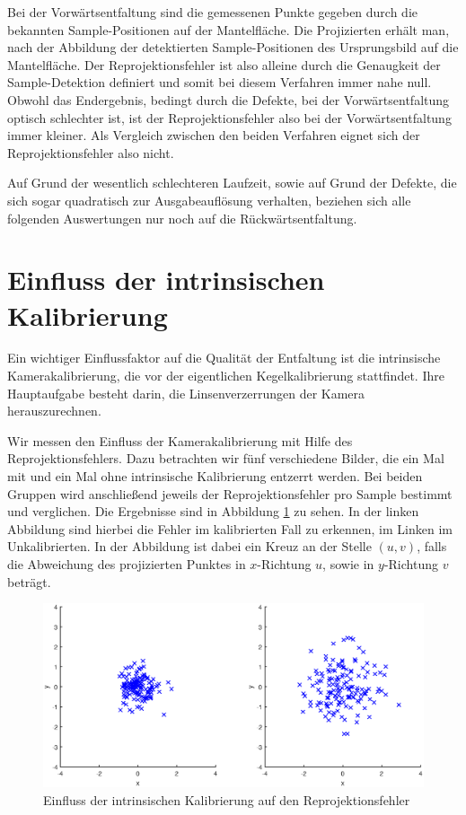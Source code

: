 Bei der Vorwärtsentfaltung sind die gemessenen Punkte gegeben durch die bekannten Sample-Positionen auf der Mantelfläche. Die Projizierten erhält man, nach der Abbildung der detektierten Sample-Positionen des Ursprungsbild auf die Mantelfläche. Der Reprojektionsfehler ist also alleine durch die Genaugkeit der Sample-Detektion definiert und somit bei diesem Verfahren immer nahe null. 
Obwohl das Endergebnis, bedingt durch die Defekte, bei der Vorwärtsentfaltung optisch schlechter ist, ist der Reprojektionsfehler also bei der Vorwärtsentfaltung immer kleiner. 
Als Vergleich zwischen den beiden Verfahren eignet sich der Reprojektionsfehler also nicht.

Auf Grund der wesentlich schlechteren Laufzeit, sowie auf Grund der Defekte, die sich sogar quadratisch zur Ausgabeauflösung verhalten, beziehen sich alle folgenden Auswertungen nur noch auf die Rückwärtsentfaltung. 

\section{Einfluss der intrinsischen Kalibrierung}
Ein wichtiger Einflussfaktor auf die Qualität der Entfaltung ist die intrinsische Kamerakalibrierung, die vor der eigentlichen Kegelkalibrierung stattfindet. Ihre Hauptaufgabe besteht darin, die Linsenverzerrungen der Kamera herauszurechnen. 

Wir messen den Einfluss der Kamerakalibrierung mit Hilfe des Reprojektionsfehlers. Dazu betrachten wir fünf verschiedene Bilder, die ein Mal mit und ein Mal ohne intrinsische Kalibrierung entzerrt werden. Bei beiden Gruppen wird anschließend jeweils der Reprojektionsfehler pro Sample bestimmt und verglichen. Die Ergebnisse sind in Abbildung \ref{fig:influenceCalib} zu sehen. In der linken Abbildung sind hierbei die Fehler im kalibrierten Fall zu erkennen, im Linken im Unkalibrierten. In der Abbildung ist dabei ein Kreuz an der Stelle $(u,v)$, falls die Abweichung des projizierten Punktes in $x$-Richtung $u$, sowie in $y$-Richtung $v$ beträgt. 

\begin{figure}[!htb]
	\centering
	\includegraphics[width=\textwidth]{images/reprojectionErrorReverse.eps}
	\caption{Einfluss der intrinsischen Kalibrierung auf den Reprojektionsfehler}
	\label{fig:influenceCalib}
\end{figure}


